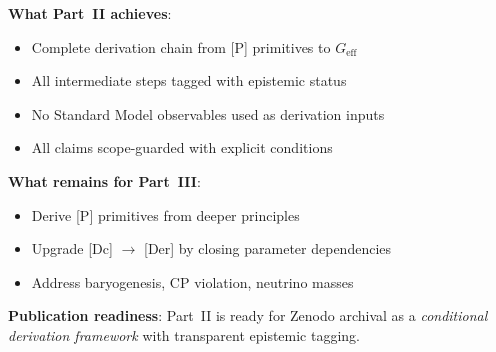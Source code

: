 
\begin{tcolorbox}[breakable, enhanced, colback=green!5!white, colframe=green!50!black,
    title=\textbf{Epistemic Checkpoint: Part II Status}, width=\linewidth]

\textbf{What Part~II achieves}:
\begin{itemize}[nosep]
    \item Complete derivation chain from [P] primitives to $G_{\text{eff}}$
    \item All intermediate steps tagged with epistemic status
    \item No Standard Model observables used as derivation inputs
    \item All claims scope-guarded with explicit conditions
\end{itemize}

\textbf{What remains for Part~III}:
\begin{itemize}[nosep]
    \item Derive [P] primitives from deeper principles
    \item Upgrade [Dc] $\to$ [Der] by closing parameter dependencies
    \item Address baryogenesis, CP violation, neutrino masses
\end{itemize}

\textbf{Publication readiness}: Part~II is ready for Zenodo archival as a
\emph{conditional derivation framework} with transparent epistemic tagging.
\end{tcolorbox}
